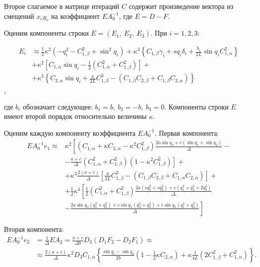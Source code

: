 Второе слагаемое в матрице итераций $C$ содержит произведение вектора из смещений $x_cy_c$ на коэффициент $EA_0^{-1}$, где $E = D - F$.

Оценим компоненты строки $E = \left(E_1,~E_2,~E_3\right)$. При $i=1,2,3$:

\begin{equation}
\begin{aligned}
	E_i & \approx \frac{1}{2}\kappa^2 \left(-q^2_i - C^2_{1,\beta} + \sin^2{q_i}\right) + \kappa^3 \left\lbrace C_{1,\beta}\gamma_i + sq_i\delta_i + \frac{b_i}{2L}\sin{q_i}C^2_{1,\alpha} \right\rbrace \\
	& + \kappa^2\left[C_{1,\alpha}\sin{q_i} - \frac{1}{2}\left(C^2_{1,\alpha} + C^2_{1,\beta}\right)\right] + \\
	& + \kappa^3\left\lbrace C_{2,\alpha}\sin{q_i} + \frac{a}{2L}C^3_{1,\beta} - \left(C_{1,\beta}C_{2,\beta} + C_{1,\beta}C_{2,\alpha}\right)\right\rbrace
\end{aligned}
\end{equation},

где $b_i$ обозначает следующее: $b_1 = b,~b_2 = -b,~b_3 = 0$. Компоненты строки $E$ имеют второй порядок относительно величины $\kappa$.

Оценим каждую компоненту коэффициента $EA^{-1}_0$. Первая компонента:
\begin{equation}
\begin{aligned}
EA^{-1}_0e_1 \approx & \kappa^2\left[\left(C_{1,\alpha} + \kappa C_{2,\alpha} - \kappa^2 C^2_{1,\beta}\right)\frac{2a\sin{q_3} + c\left(\sin{q_1} + \sin{q_2}\right)}{\Delta} - \right.\\
&\left. - \frac{a+c}{\Delta}\left(C^2_{1,\alpha} + C^2_{1,\beta}\right)\left(1 - \kappa^2 C^2_{1,\beta}\right)\right] + \\
& + \kappa^3\frac{2\left(a+c\right)}{\Delta} \left[\frac{a}{2L}C^3_{1,\beta} - \left(C_{1,\beta}C_{2,\beta} + C_{1,\alpha}C_{2,\alpha}\right)\right] + \\
& + \frac{1}{2}\kappa^4\left[ \frac{1}{2}\left(C^2_{1,\alpha} + C^2_{1,\beta}\right) \frac{2a\left(sq^2_1 + sq^2_2\right) + c\left(q^2_1 + q^2_2 + 2q^2_3\right)}{\Delta}\right. \\
& -\left. \frac{2a\sin{q_3}\left(q^2_1 + q^2_2\right) + c\sin{q_1}\left(q^2_2 + q^2_3\right) + c\sin{q_2}\left(q^2_1 + q^2_3\right)}{\Delta} \right]
\end{aligned}
\end{equation}

Вторая компонента:
\begin{equation}
\begin{aligned}
EA^{-1}_0 e_2 & = \frac{1}{\Delta}EA_2 = \frac{a+c}{\Delta b}D_3\left(D_1F_2 - D_2F_1\right) \approx\\
& \approx \frac{2\left(a+c\right)}{\Delta}\kappa^2D_3C_{1,\alpha}\left\lbrace \frac{\sin{q_1} - \sin{q_2}}{2b}\left(1 - \frac{1}{2}\kappa C_{2,\alpha}\right) + \kappa \frac{1}{4L}\left(2C^2_{1,\beta} + C^2_{1,\alpha}\right)\right\rbrace.
\end{aligned}
\end{equation}

